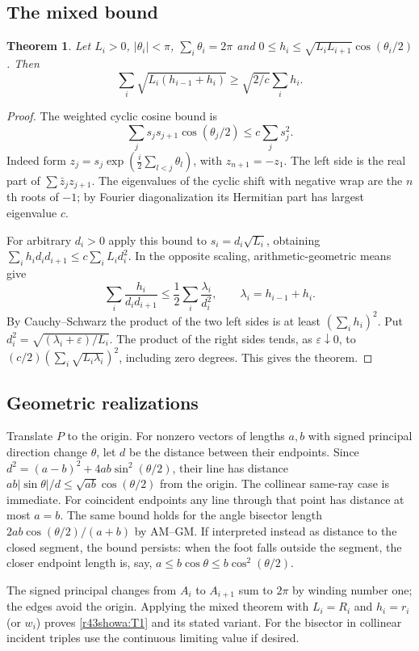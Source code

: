 \documentclass[11pt,a4paper]{article}
\numberwithin{equation}{section}
\newtheorem{theorem}{Theorem}[section]
\theoremstyle{definition}
\theoremstyle{remark}
\begin{document}
\subsection{The mixed bound}
\begin{theorem}
Let $L_i>0$, $|\theta_i|<\pi$, $\sum_i\theta_i=2\pi$ and
$0\le h_i\le\sqrt{L_iL_{i+1}}\cos(\theta_i/2)$. Then
\[
 \sum_i\sqrt{L_i(h_{i-1}+h_i)}\ge\sqrt{2/c}\sum_i h_i.
\]
\end{theorem}
\begin{proof}
The weighted cyclic cosine bound is
\[
 \sum_j s_js_{j+1}\cos(\theta_j/2)\le c\sum_j s_j^2.
\]
Indeed form $z_j=s_j\exp(\tfrac i2\sum_{l<j}\theta_l)$, with $z_{n+1}=-z_1$. The left side is the real part of $\sum\bar z_jz_{j+1}$. The eigenvalues of the cyclic shift with negative wrap are the $n$th roots of $-1$; by Fourier diagonalization its Hermitian part has largest eigenvalue $c$.

For arbitrary $d_i>0$ apply this bound to $s_i=d_i\sqrt{L_i}$, obtaining $\sum_i h_i d_id_{i+1}\le c\sum_i L_i d_i^2$. In the opposite scaling, arithmetic-geometric means give
\[
 \sum_i\frac{h_i}{d_i d_{i+1}}\le
 \frac12\sum_i\frac{\lambda_i}{d_i^2},
 \qquad\lambda_i=h_{i-1}+h_i.
\]
By Cauchy--Schwarz the product of the two left sides is at least $(\sum_i h_i)^2$. Put $d_i^2=\sqrt{(\lambda_i+\varepsilon)/L_i}$. The product of the right sides tends, as $\varepsilon\downarrow0$, to $(c/2)(\sum_i\sqrt{L_i\lambda_i})^2$, including zero degrees. This gives the theorem.
\end{proof}
\subsection{Geometric realizations}
Translate $P$ to the origin. For nonzero vectors of lengths $a,b$ with signed principal direction change $\theta$, let $d$ be the distance between their endpoints. Since $d^2=(a-b)^2+4ab\sin^2(\theta/2)$, their line has distance $ab|\sin\theta|/d\le\sqrt{ab}\cos(\theta/2)$ from the origin. The collinear same-ray case is immediate. For coincident endpoints any line through that point has distance at most $a=b$. The same bound holds for the angle bisector length $2ab\cos(\theta/2)/(a+b)$ by AM--GM. If interpreted instead as distance to the closed segment, the bound persists: when the foot falls outside the segment, the closer endpoint length is, say, $a\le b\cos\theta\le b\cos^2(\theta/2)$.

The signed principal changes from $A_i$ to $A_{i+1}$ sum to $2\pi$ by winding number one; the edges avoid the origin. Applying the mixed theorem with $L_i=R_i$ and $h_i=r_i$ (or $w_i$) proves \eqref{r43showa:T1} and its stated variant. For the bisector in collinear incident triples use the continuous limiting value if desired.
\end{document}
